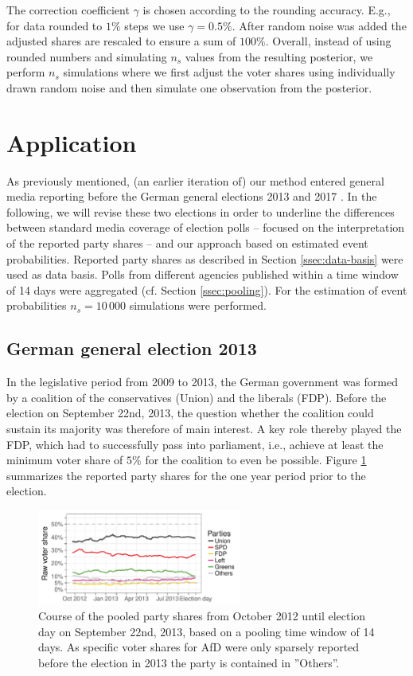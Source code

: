 \documentclass[smallcondensed]{svjour3}     %
\begin{document}
The correction coefficient $\gamma$ is chosen according to the rounding accuracy.
E.g., for data rounded to $1\%$ steps we use $\gamma = 0.5\%$. After random noise
was added the adjusted shares are rescaled to ensure a sum of $100\%$. Overall,
instead of using rounded numbers and simulating $n_s$ values from the resulting
posterior, we perform $n_s$ simulations where we first adjust the voter shares
using individually drawn random noise and then simulate one observation from the
posterior.\\


\section{Application} \label{sec:application}
As previously mentioned, (an earlier iteration of) our method entered
general media reporting before the German general elections
2013 and 2017 \citep[cf.][]{wahlistik_2013, gelitz_2017}.
In the following, we will revise these two elections in order to underline the
differences between standard media coverage of election polls
-- focused on the interpretation of the reported party shares --
and our approach based on estimated event probabilities. Reported party shares as
described in Section \ref{ssec:data-basis} were used as data basis.
Polls from different agencies published within a time window of 14 days were
aggregated (cf. Section \ref{ssec:pooling}). For the estimation of event
probabilities $n_{s} = 10\,000$ simulations were performed.


\subsection{German general election 2013} \label{subsec:2013}
In the legislative period from 2009 to 2013, the German government was formed by
a coalition of the conservatives (Union) and the liberals (FDP). Before the
election on September 22nd, 2013, the question whether the coalition could
sustain its majority was therefore of main interest.
A key role thereby played the FDP, which had to successfully pass into parliament,
i.e., achieve at least the minimum voter share of $5\%$ for the coalition
to even be possible. Figure \ref{fig:2013} summarizes the reported party
shares for the one year period prior to the election.

\begin{figure}[H]\centering
\includegraphics[width=0.6\textwidth]{figures/2013_pooled_rawShares.pdf}
\caption{Course of the pooled party shares from October 2012 until election day on
September 22nd, 2013, based on a pooling time window of 14 days.
As specific voter shares for AfD were only sparsely reported before the election in 2013
the party is contained in ''Others''.
\label{fig:2013}
}
\end{figure}
\end{document}
